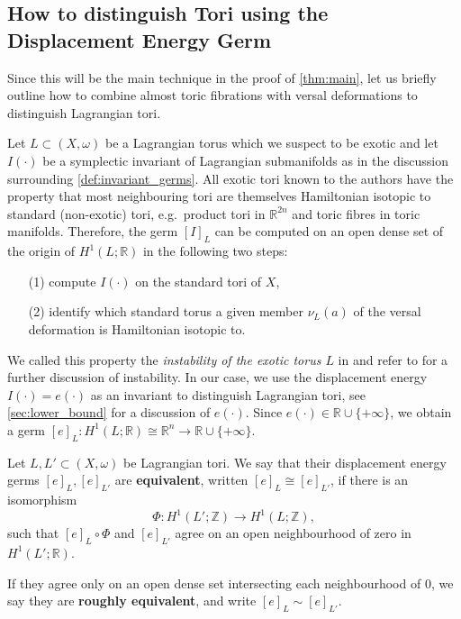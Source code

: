 \documentclass[12pt,a4paper,abstract=true,draft]{scrartcl}
\begin{document}
\subsection{How to distinguish Tori using the Displacement Energy Germ}
\label{sec:howto_exotic}

Since this will be the main technique in the proof of \cref{thm:main}, let us briefly outline how to combine almost toric fibrations with versal deformations to distinguish Lagrangian tori. 

Let $L \subset (X,\omega)$ be a Lagrangian torus which we suspect to be exotic and let $I(\cdot)$ be a symplectic invariant of Lagrangian submanifolds as in the discussion surrounding \cref{def:invariant_germs}.
All exotic tori known to the authors have the property that most neighbouring tori are themselves Hamiltonian isotopic to standard (non-exotic) tori, e.g.\ product tori in $\mathbb{R}^{2n}$ and toric fibres in toric manifolds.
Therefore, the germ $[I]_L$ can be computed on an open dense set of the origin of $H^1(L;\mathbb{R})$ in the following two steps: 
\begin{enumerate}
    \item[(1)] compute $I(\cdot)$ on the standard tori of $X$, 
    \item[(2)] identify which standard torus a given member $\nu_L(a)$ of the versal deformation is Hamiltonian isotopic to. 
\end{enumerate}
We called this property the \textit{instability of the exotic torus $L$} in \cite{brendel2023local} and refer to \cite[Sections 1.6, 5.1]{brendel2023local} for a further discussion of instability.
In our case, we use the displacement energy $I(\cdot) = e(\cdot)$ as an invariant to distinguish Lagrangian tori, see \cref{sec:lower_bound} for a discussion of $e(\cdot)$.
Since $e(\cdot) \in \mathbb{R} \cup \{+\infty\}$, we obtain a germ $[e]_L \colon H^1(L;\mathbb{R}) \cong \mathbb{R}^n \rightarrow \mathbb{R} \cup \{+\infty\}$. 

\begin{definition}
    \label{def:deg_equiv}
    Let $L,L' \subset (X,\omega)$ be Lagrangian tori.
We say that their displacement energy germs $[e]_L,[e]_{L'}$ are \textbf{equivalent}, written $[e]_L \cong [e]_{L'}$, if there is an isomorphism 
    \begin{equation}
        \label{eq:phi_isomorphism}
        Φ \colon H^1(L';\mathbb{Z}) \rightarrow H^1(L;\mathbb{Z}),
    \end{equation}
    such that $[e]_L \circ Φ$ and $[e]_{L'}$ agree on an open neighbourhood of zero in $H^1(L';\mathbb{R})$.
    
    If they agree only on an open dense set intersecting each neighbourhood of $0$, we say they are \textbf{roughly equivalent}, and write $[e]_L \sim [e]_{L'}$.
\end{definition}
\end{document}
